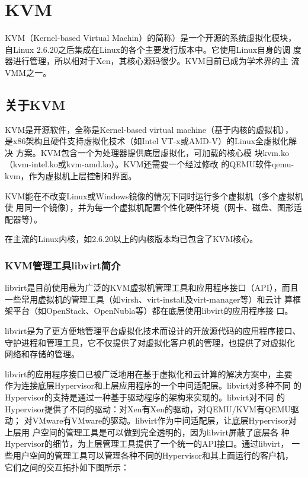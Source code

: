\chapter{KVM}
\label{chap:kvm}

KVM（Kernel-based Virtual Machin）的简称）是一个开源的系统虚拟化模块，
自Linux 2.6.20之后集成在Linux的各个主要发行版本中。它使用Linux自身的调
度器进行管理，所以相对于Xen，其核心源码很少。KVM目前已成为学术界的主
流VMM之一。

\section{关于KVM}
\label{sec:AboutKVM}

KVM是开源软件，全称是Kernel-based virtual machine（基于内核的虚拟机），
是x86架构且硬件支持虚拟化技术（如Intel VT-x或AMD-V）的Linux全虚拟化解决
方案。KVM包含一个为处理器提供底层虚拟化，可加载的核心模
块kvm.ko（kvm-intel.ko或kvm-amd.ko）。KVM还需要一个经过修改
的QEMU软件qemu-kvm，作为虚拟机上层控制和界面。

KVM能在不改变Linux或Windows镜像的情况下同时运行多个虚拟机（多个虚拟机使
用同一个镜像），并为每一个虚拟机配置个性化硬件环境（网卡、磁盘、图形适
配器等）。

在主流的Linux内核，如2.6.20以上的内核版本均已包含了KVM核心。

\subsection{KVM管理工具libvirt简介}
\label{sec:libvirtIntro}

libvirt是目前使用最为广泛的KVM虚拟机管理工具和应用程序接口（API），而且
一些常用虚拟机的管理工具（如virsh、virt-install及virt-manager等）和云计
算框架平台（如OpenStack、OpenNubla等）都在底层使用libvirt的应用程序接
口。

libvirt是为了更方便地管理平台虚拟化技术而设计的开放源代码的应用程序接口、
守护进程和管理工具，它不仅提供了对虚拟化客户机的管理，也提供了对虚拟化
网络和存储的管理。

libvirt的应用程序接口已被广泛地用在基于虚拟化和云计算的解决方案中，主要
作为连接底层Hypervisor和上层应用程序的一个中间适配层。libvirt对多种不同
的Hypervisor的支持是通过一种基于驱动程序的架构来实现的。libvirt对不同
的Hypervisor提供了不同的驱动：对Xen有Xen的驱动，对QEMU/KVM有QEMU驱动；
对VMware有VMware的驱动。libvirt作为中间适配层，让底层Hypervisor对上层用
户空间的管理工具是可以做到完全透明的，因为libvirt屏蔽了底层各
种Hypervisor的细节，为上层管理工具提供了一个统一的API接口。通过libvirt，
一些用户空间的管理工具可以管理各种不同的Hypervisor和其上面运行的客户机，
它们之间的交互拓扑如下图所示：

